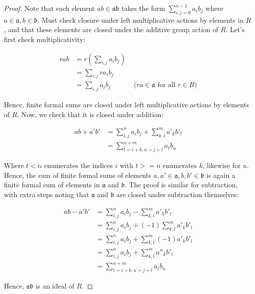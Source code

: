 \documentclass[10pt]{article}
\newcommand{\ia}{\mathfrak{a}}
\newcommand{\ib}{\mathfrak{b}}
\begin{document}
\begin{proof}

Note that each element $ab \in \ia\ib$ takes the form $\sum_{i,j = 0}^{n-1} a_i b_j$ where $a \in \ia, b\in \ib$. Must check closure under left multiplicative actions by elements in $R$, and that these elements are closed under the additive group action of $R$. Let's first check multiplicativity: 

\begin{equation*}
	\begin{aligned}
	rab & = r(\sum_{i,j} a_i b_j) \\
	      & = \sum_{i,j} ra_i b_j \\
	      & = \sum_{i,j} a_i b_j   & \text{ ($ra \in \ia$ for all $r \in R$)}
	\end{aligned}
\end{equation*}

Hence, finite formal sums are closed under left multiplicative actions by elements of $R$. Now, we check that it is closed under addition: 

\begin{equation*}
	\begin{aligned}
	ab + a'b' & = \sum_{i,j}^n a_i b_j + \sum_{k,l}^m a'_k b'_l\\
	      & = \sum_{t = i + k, u = j + l}^{n + m} a_t b_u
	\end{aligned}
\end{equation*}

Where $t < n$ enumerates the indices $i$ with $t >= n$ enumerates $k$, likewise for $u$. Hence, the sum of finite formal sums of elements $a, a' \in \ia, b, b' \in \ib$ is again a finite formal sum of elements in $\ia$ and $\ib$. The proof is similar for subtraction, with extra steps noting that $\ia$ and $\ib$ are closed under subtraction themselves:

\begin{equation*}
	\begin{aligned}
	 ab - a'b' & = \sum_{i,j}^n a_i b_j - \sum_{k,l}^m a'_k b'_l \\
	   	      & = \sum_{i,j}^n a_i b_j + (-1)\sum_{k,l}^m a'_k b'_l \\
		      & = \sum_{i,j}^n a_i b_j + \sum_{k,l}^m (-1)a'_k b'_l  \\
		      & = \sum_{i,j}^n a_i b_j + \sum_{k,l}^m a''_k b'_l \\
		      & = \sum_{t = i + k, u = j + l}^{n + m} a_t b_u
	\end{aligned}
\end{equation*}

Hence, $\ia\ib$ is an ideal of $R$.
\end{proof}
\end{document}

